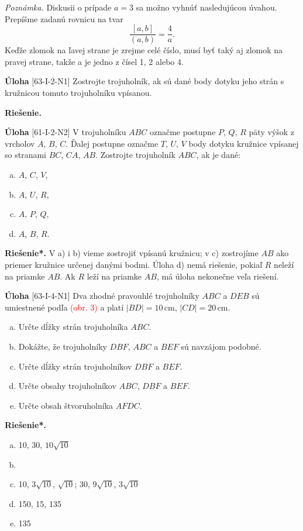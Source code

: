 \documentclass{article}
\newcommand{\rie}{\textbf{Riešenie.} }
\newcommand{\rieh}{\textbf{Riešenie*.} }
\newcommand\todo[1]{\noindent\textcolor{red}{(#1)}}
\newcommand{\problem}[3]{
  \begin{tcolorbox}[breakable,notitle,boxrule=0pt,colback=light-gray,colframe=light-gray]
    \textbf{Úloha}
    [#1] #2
  \end{tcolorbox}
  \noindent#3
}
\begin{document}
{\textit{Poznámka.} Diskusii o prípade $a = 3$ sa možno vyhnúť nasledujúcou úvahou. Prepíšme zadanú rovnicu na tvar
$$\frac{[a, b]}{(a, b)}=\frac{4}{a}.$$
Keďže zlomok na ľavej strane je zrejme celé číslo, musí byť taký aj zlomok na pravej strane, takže a je jedno z čísel 1, 2 alebo 4.
}


\problem{63-I-2-N1}{
Zostrojte trojuholník, ak sú dané body dotyku jeho strán s kružnicou tomuto trojuholníku vpísanou.
}{
\rie
}


\problem{61-I-2-N2}{
V trojuholníku $ABC$ označme postupne $P$, $Q$, $R$ päty výšok z vrcholov $A$, $B$, $C$. Ďalej postupne označme $T$, $U$, $V$ body dotyku kružnice vpísanej so stranami $BC$, $CA$, $AB$.
Zostrojte trojuholník $ABC$, ak je dané:
\begin{enumerate}[a)]
    \item $A$, $C$, $V$,
    \item $A$, $U$, $R$,
    \item $A$, $P$, $Q$,
    \item $A$, $B$, $R$.
\end{enumerate}
}{
\rieh V a) i b) vieme zostrojiť vpísanú kružnicu; v c) zostrojíme $AB$ ako priemer kružnice určenej danými bodmi. Úloha d) nemá riešenie, pokiaľ $R$ neleží na priamke $AB$. Ak $R$ leží na priamke $AB$, má úloha nekonečne veľa riešení.
}

\problem{63-I-4-N1}{
Dva zhodné pravouhlé trojuholníky $ABC$ a $DEB$ sú umiestnené podľa \todo{obr. 3} a platí $|BD| = 10$\,cm, $|CD| = 20$\,cm.
\begin{enumerate}[a)]
    \item Určte dĺžky strán trojuholníka $ABC$. 
    \item Dokážte, že trojuholníky $DBF$, $ABC$ a $BEF$ sú navzájom podobné.
    \item Určte dĺžky strán trojuholníkov $DBF$ a $BEF$. 
    \item Určte obsahy trojuholníkov $ABC$, $DBF$ a $BEF$. 
    \item Určte obsah štvoruholníka $AFDC$. 
\end{enumerate}
}{
\rieh \begin{enumerate}[a)]
    \item 10, 30, $10\sqrt{10}$
    \item
    \item 10, $3\sqrt{10}$, $\sqrt{10}$; 30, $9\sqrt{10}$, $3\sqrt{10}$
    \item 150, 15, 135
    \item 135
\end{enumerate}
}
\end{document}
